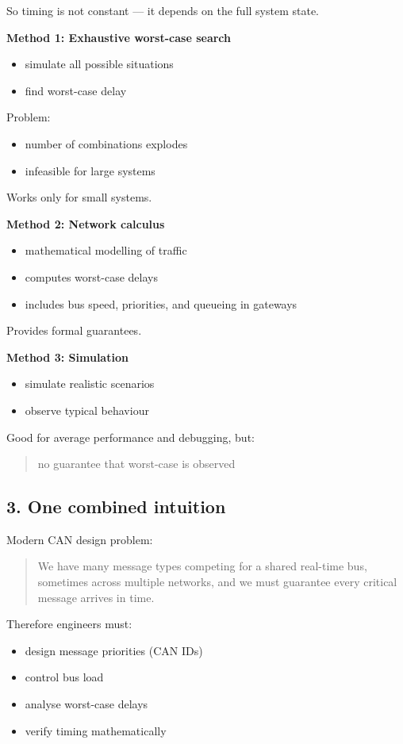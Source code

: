 So timing is not constant — it depends on the full system state.

\textbf{Method 1: Exhaustive worst-case search}
\begin{itemize}
\item simulate all possible situations
\item find worst-case delay
\end{itemize}

Problem:
\begin{itemize}
\item number of combinations explodes
\item infeasible for large systems
\end{itemize}

Works only for small systems.

\textbf{Method 2: Network calculus}
\begin{itemize}
\item mathematical modelling of traffic
\item computes worst-case delays
\item includes bus speed, priorities, and queueing in gateways
\end{itemize}

Provides formal guarantees.

\textbf{Method 3: Simulation}
\begin{itemize}
\item simulate realistic scenarios
\item observe typical behaviour
\end{itemize}

Good for average performance and debugging, but:
\begin{quote}
no guarantee that worst-case is observed
\end{quote}
\begin{mdframed}[backgroundcolor=lightgray, linewidth=0pt, innertopmargin=8pt,
innerbottommargin=8pt]
\subsection*{3. One combined intuition}

Modern CAN design problem:

\begin{quote}
We have many message types competing for a shared real-time bus, sometimes across multiple networks, and we must guarantee every critical message arrives in time.
\end{quote}

Therefore engineers must:
\begin{itemize}
\item design message priorities (CAN IDs)
\item control bus load
\item analyse worst-case delays
\item verify timing mathematically
\end{itemize}
\end{mdframed}

